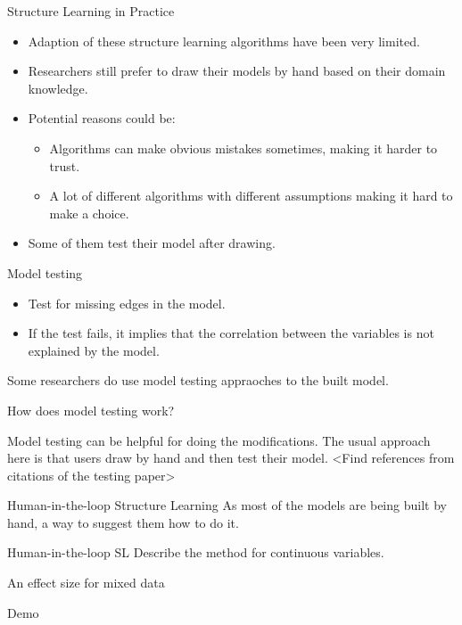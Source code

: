 \documentclass{beamer}
\begin{document}
\begin{frame}{Structure Learning in Practice}
	\begin{itemize}
		\item Adaption of these structure learning algorithms have been very limited.
		\item Researchers still prefer to draw their models by hand based on their domain knowledge.
		\item Potential reasons could be:
			\begin{itemize}
				\item Algorithms can make obvious mistakes sometimes, making it harder to trust.
				\item A lot of different algorithms with different assumptions making it hard to make a choice.
			\end{itemize}
		\item Some of them test their model after drawing.
	\end{itemize}
\end{frame}

\begin{frame}{Model testing}

	\begin{itemize}
		\item Test for missing edges in the model.
		\item If the test fails, it implies that the correlation between the variables is not explained by the model.
	\end{itemize}

	Some researchers do use model testing appraoches to the built model.

	How does model testing work?

	Model testing can be helpful for doing the modifications.
	The usual approach here is that users draw by hand and then test their model. <Find references from citations of the testing paper>
\end{frame}

\begin{frame}{Human-in-the-loop Structure Learning}
	As most of the models are being built by hand, a way to suggest them how to do it.
\end{frame}

\begin{frame}{Human-in-the-loop SL}
	Describe the method for continuous variables.
\end{frame}

\begin{frame}{An effect size for mixed data}
\end{frame}

\begin{frame}{Demo}
\end{frame}
\end{document}
